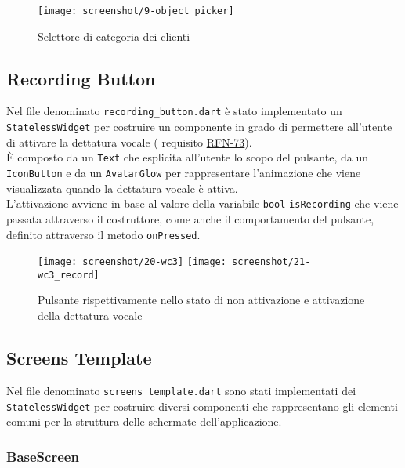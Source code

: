 \begin{figure}[!h] 
    \centering 
    \texttt{[image: screenshot/9-object\_picker]}
    \caption{Selettore di categoria dei clienti}
    \label{fig:object-picker}
\end{figure}

\subsection{Recording Button}
\label{subsec:recording-button}

Nel file denominato \lstinline{recording_button.dart} è stato implementato un \lstinline{StatelessWidget} per costruire un componente in grado di permettere all'utente di attivare la dettatura vocale ( requisito \hyperref[RFN-73]{RFN-73}).\\
È composto da un \lstinline{Text}\cite{site:text} che esplicita all'utente lo scopo del pulsante, da un \lstinline{IconButton}\cite{site:icon-button} e da un \lstinline{AvatarGlow}\cite{site:avatar-glow} per rappresentare l'animazione che viene visualizzata quando la dettatura vocale è attiva.\\
L'attivazione avviene in base al valore della variabile \lstinline{bool} \lstinline{isRecording} che viene passata attraverso il costruttore, come anche il comportamento del pulsante, definito attraverso il metodo \lstinline{onPressed}\cite{site:on-pressed}.

\begin{figure}[!h] 
    \centering 
    \texttt{[image: screenshot/20-wc3]}
    \hfill
    \texttt{[image: screenshot/21-wc3\_record]} 
    \caption{Pulsante rispettivamente nello stato di non attivazione e attivazione della dettatura vocale}
    \label{fig:record-button}
\end{figure}

\newpage

\subsection{Screens Template}
\label{subsec:screens-template}

Nel file denominato \lstinline{screens_template.dart} sono stati implementati dei \lstinline{StatelessWidget} per costruire diversi componenti che rappresentano gli elementi comuni per la struttura delle schermate dell'applicazione.

\subsubsection*{BaseScreen}
\label{subsubsec:base-screen}

